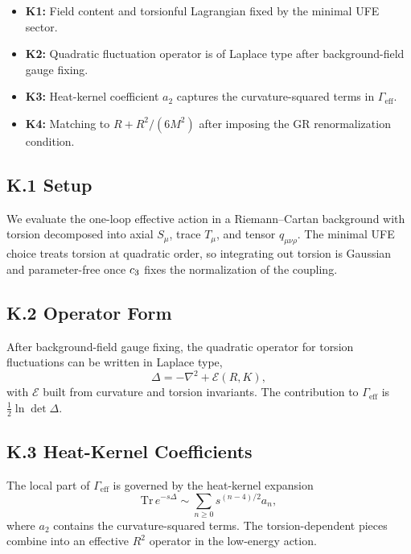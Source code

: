 \begin{tcolorbox}[colback=gray!5, colframe=gray!60, 
    title={\textbf{Assumptions K1--K4}}, fonttitle=\bfseries\small]
\begin{itemize}[leftmargin=1.5em, topsep=2pt, itemsep=1pt]
    \item \textbf{K1:} Field content and torsionful Lagrangian fixed by the minimal UFE sector.
    \item \textbf{K2:} Quadratic fluctuation operator is of Laplace type after background-field gauge fixing.
    \item \textbf{K3:} Heat-kernel coefficient $a_2$ captures the curvature-squared terms in $\Gamma_{\mathrm{eff}}$.
    \item \textbf{K4:} Matching to $R + R^2/(6M^2)$ after imposing the GR renormalization condition.
\end{itemize}
\end{tcolorbox}

\subsection{K.1 Setup}
We evaluate the one-loop effective action in a Riemann--Cartan background with torsion
decomposed into axial $S_\mu$, trace $T_\mu$, and tensor $q_{\mu\nu\rho}$. The minimal UFE
choice treats torsion at quadratic order, so integrating out torsion is Gaussian and
parameter-free once $c_3$ fixes the normalization of the coupling.

\subsection{K.2 Operator Form}
After background-field gauge fixing, the quadratic operator for torsion fluctuations can be
written in Laplace type,
\begin{equation}
    \Delta = -\nabla^2 + \mathcal{E}(R,K),
\end{equation}
with $\mathcal{E}$ built from curvature and torsion invariants. The contribution to
$\Gamma_{\mathrm{eff}}$ is $\frac{1}{2}\ln\det\Delta$.

\subsection{K.3 Heat-Kernel Coefficients}
The local part of $\Gamma_{\mathrm{eff}}$ is governed by the heat-kernel expansion
\begin{equation}
    \mathrm{Tr}\,e^{-s\Delta} \sim \sum_{n\ge 0} s^{(n-4)/2} a_n,
\end{equation}
where $a_2$ contains the curvature-squared terms. The torsion-dependent pieces combine into
an effective $R^2$ operator in the low-energy action.

